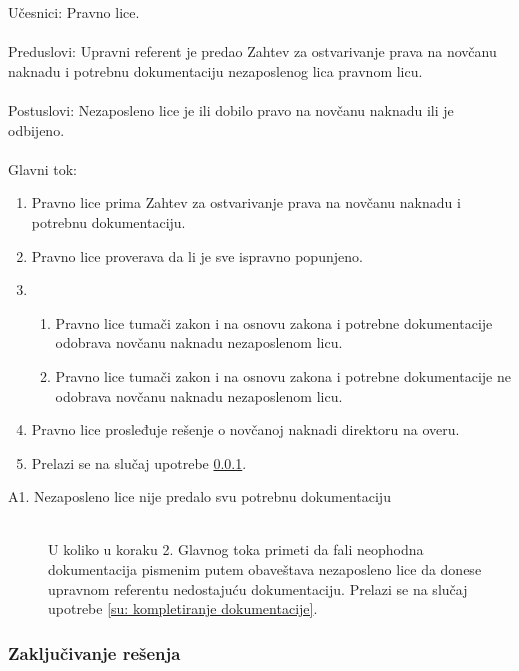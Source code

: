 \noindent Učesnici: Pravno lice.
\\
\\ Preduslovi: Upravni referent je predao Zahtev za ostvarivanje prava na novčanu naknadu i potrebnu dokumentaciju nezaposlenog lica pravnom licu.
\\
\\ Postuslovi: Nezaposleno lice je ili dobilo pravo na novčanu naknadu ili je odbijeno.
\\
\\ Glavni tok:
\begin{enumerate}
\item Pravno lice prima Zahtev za ostvarivanje prava na novčanu naknadu i potrebnu dokumentaciju.
\item Pravno lice proverava da li je sve ispravno popunjeno.
\item \begin{enumerate}
\item Pravno lice tumači zakon i na osnovu zakona i potrebne dokumentacije odobrava novčanu naknadu nezaposlenom licu.
\item Pravno lice tumači zakon i na osnovu zakona i potrebne dokumentacije ne odobrava novčanu naknadu nezaposlenom licu.
\end{enumerate}
\item Pravno lice prosleđuje rešenje o novčanoj naknadi direktoru na overu.
\item Prelazi se na slu\v caj upotrebe \ref{su: gde je pecat}.
\end{enumerate}

\begin{description}
\item [A1. Nezaposleno lice nije predalo svu potrebnu dokumentaciju] ~\\
	U koliko u koraku 2. Glavnog toka primeti da fali neophodna dokumentacija pismenim putem obaveštava nezaposleno lice da donese upravnom referentu nedostajuću dokumentaciju. Prelazi se na slučaj upotrebe \ref{su: kompletiranje dokumentacije}.
\end{description}


\subsubsection{Zaključivanje rešenja}
\label{su: gde je pecat}

